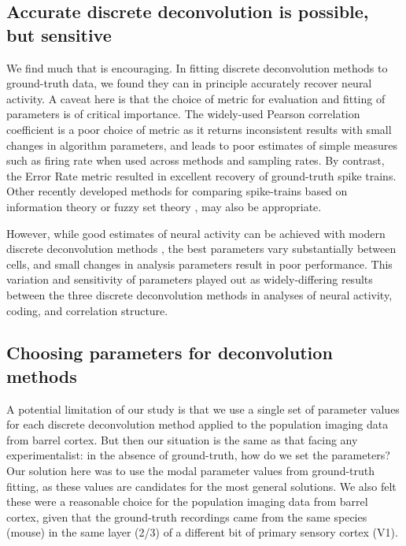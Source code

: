 \documentclass[a4paper,11pt]{article}
\begin{document}
\subsection{Accurate discrete deconvolution is possible, but sensitive}
We find much that is encouraging. In fitting discrete deconvolution methods to ground-truth data, we found they can in principle accurately recover neural activity. A caveat here is that the choice of metric for evaluation and fitting of parameters is of critical importance. The widely-used Pearson correlation coefficient is a poor choice of metric as it returns inconsistent results with small changes in algorithm parameters, and leads to poor estimates of simple measures such as firing rate when used across methods and sampling rates. By contrast, the Error Rate metric \citep{Deneux2016-gu, Victor1996-cg} resulted in excellent recovery of ground-truth spike trains. Other recently developed methods for comparing spike-trains based on information theory \citep{Theis2016-ee} or fuzzy set theory \citep{Reynolds2018-yh}, may also be appropriate. 

However, while good estimates of neural activity can be achieved with modern discrete deconvolution methods \citep{Berens2018-su, Pachitariu2018-cj}, the best parameters vary substantially between cells, and small changes in analysis parameters result in poor performance. This variation and sensitivity of parameters played out as widely-differing results between the three discrete deconvolution methods in analyses of neural activity, coding, and correlation structure.

\subsection{Choosing parameters for deconvolution methods} 
A potential limitation of our study is that we use a single set of parameter values for each discrete deconvolution method applied to the population imaging data from barrel cortex. But then our situation is the same as that facing any experimentalist: in the absence of ground-truth, how do we set the parameters? Our solution here was to use the modal parameter values from ground-truth fitting, as these values are candidates for the most general solutions. We also felt these were a reasonable choice for the population imaging data from barrel cortex, given that the ground-truth recordings came from the same species (mouse) in the same layer (2/3) of a different bit of primary sensory cortex (V1). 
\end{document}
